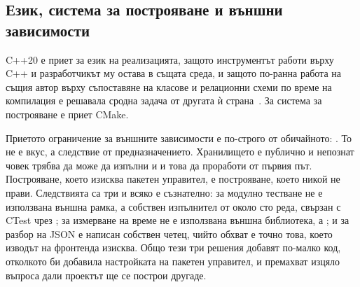 \subsection{Език, система за построяване и външни зависимости}

C++20 е приет за език на реализацията, защото инструментът работи върху C++ и
разработчикът му остава в същата среда, и защото по-ранна работа на същия автор върху
съпоставяне на класове и релационни схеми по време на компилация е решавала сродна задача
от другата ѝ страна~\cite{tsvetanov_bsc_orm}. За система за построяване е приет CMake.

Приетото ограничение за външните зависимости е по-строго от обичайното: . То не е вкус, а следствие от предназначението. Хранилището
е публично и непознат човек трябва да може да изпълни  и
 и това да проработи от първия път. Построяване, което изисква
пакетен управител, е построяване, което никой не прави. Следствията са три и всяко е
съзнателно: за модулно тестване не е използвана външна рамка, а собствен изпълнител от
около сто реда, свързан с CTest чрез ; за измерване на време не е
използвана външна библиотека, а ; и за разбор на JSON е
написан собствен четец, чийто обхват е точно това, което изводът на фронтенда изисква.
Общо тези три решения добавят по-малко код, отколкото би добавила настройката на пакетен
управител, и премахват изцяло въпроса дали проектът ще се построи другаде.
